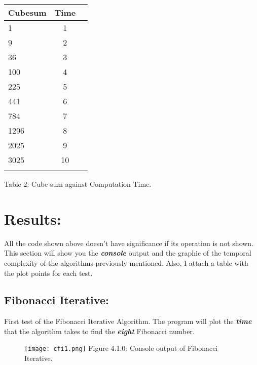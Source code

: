 \documentclass[10pt,a4paper]{article}
\begin{document}
\begin{center}
\begin{itemize}
\end{itemize}
\begin{tabular}[.5cm]{l c c }
\toprule
Cubesum & Time \\
\midrule
1 & 1 \\
\cmidrule{1-2}
9 & 2 \\
\cmidrule{1-2}
36 & 3 \\
\cmidrule{1-2}
100 & 4 \\
\cmidrule{1-2}
225 & 5 \\
\cmidrule{1-2}
441 & 6 \\
\cmidrule{1-2}
784 & 7 \\
\cmidrule{1-2}
1296 & 8 \\
\cmidrule{1-2}
2025 & 9 \\
\cmidrule{1-2}
3025 & 10 \\
\bottomrule
\linebreak
\end{tabular}
\linebreak Table 2: Cube sum against Computation Time.
\end{center}

\pagebreak

\section{Results:}

All the code shown above doesn't have significance if its operation is not shown. This section will show you the {\bfseries\itshape console} output and the graphic of the temporal complexity of the algorithms previously mentioned. Also, I attach a table with the plot points for each test.

\subsection{Fibonacci Iterative:}

First test of the Fibonacci Iterative Algorithm. The program will plot the {\bfseries\itshape time} that the algorithm takes to find the {\bfseries\itshape eight} Fibonacci number.

\begin{figure}[H]
\texttt{[image: cfi1.png]}
\centering \linebreak \linebreak Figure 4.1.0: Console output of Fibonacci Iterative.
\end{figure}
\end{document}
